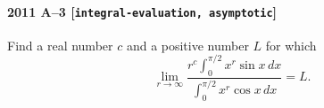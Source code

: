 \paragraph{2011 A--3 \textnormal{[\texttt{integral-evaluation, asymptotic}]}}
Find a real number $c$ and a positive number $L$ for which
\[
\lim_{r\to\infty} \frac{r^c \int_0^{\pi/2} x^r \sin x \,dx}{\int_0^{\pi/2} x^r \cos x \,dx} = L.
\]

